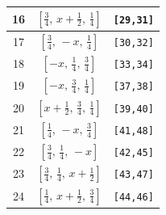 \documentclass[fleqn,8pt]{jsarticle}
\begin{document}
\begin{longtable}{ccc}
16 & $\left[ \frac{3}{4},\, x + \frac{1}{2},\, \frac{1}{4} \right]$ & {\tt [29,31]} \\ \hline
17 & $\left[ \frac{3}{4},\, - x,\, \frac{1}{4} \right]$ & {\tt [30,32]} \\ \hline
18 & $\left[ - x,\, \frac{1}{4},\, \frac{3}{4} \right]$ & {\tt [33,34]} \\ \hline
19 & $\left[ - x,\, \frac{3}{4},\, \frac{1}{4} \right]$ & {\tt [37,38]} \\ \hline
20 & $\left[ x + \frac{1}{2},\, \frac{3}{4},\, \frac{1}{4} \right]$ & {\tt [39,40]} \\ \hline
21 & $\left[ \frac{1}{4},\, - x,\, \frac{3}{4} \right]$ & {\tt [41,48]} \\ \hline
22 & $\left[ \frac{3}{4},\, \frac{1}{4},\, - x \right]$ & {\tt [42,45]} \\ \hline
23 & $\left[ \frac{3}{4},\, \frac{1}{4},\, x + \frac{1}{2} \right]$ & {\tt [43,47]} \\ \hline
24 & $\left[ \frac{1}{4},\, x + \frac{1}{2},\, \frac{3}{4} \right]$ & {\tt [44,46]} \\
\end{longtable}
\renewcommand{\arraystretch}{1.2}
\end{document}
